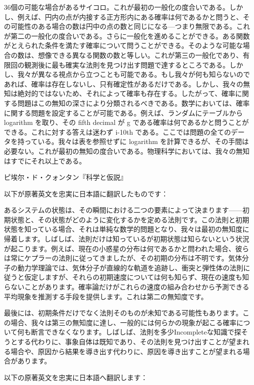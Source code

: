 \documentclass[a4paper,11pt,openany]{ltjsbook}
\begin{document}
36個の可能な場合があるサイコロ。これが最初の一般化の度合いである。しかし、例えば、円内の点が内接する正方形内にある確率は何であるかと問うと、その可能性のある場合の数は円中の点の数と同じになる—つまり無限である。これが第二の一般化の度合いである。さらに一般化を進めることができる。ある関数がとえられた条件を満たす確率について問うことができる。そのような可能な場合の数は、想像できる異なる関数の数と等しい。これが第三の一般化であり、有限回の観測後に最も確実な法則を見つけ出す問題で達するところである。しかし、我々が異なる視点から立つことも可能である。もし我々が何も知らないのであれば、確率は存在しないし、只有確定性があるだけである。しかし、我々の無知は絶対的ではないため、それによって確率も存在する。したがって、確率に関する問題はこの無知の深さにより分類されるべきである。数学においては、確率に関する問題を設定することが可能である。例えば、ランダムにテーブルから logarithm を取り、その fifth decimal が g である確率は何であるかと問うことができる。これに対する答えは迷わず i-10th である。ここでは問題の全てのデータを持っている。我々は表を参照せずに logarithm を計算できるが、その手間は必要ない。これが最初の無知の度合いである。物理科学においては、我々の無知はすでにそれ以上である。

ピ埃尔・ド・クォンタン『科学と仮説』

以下が原著英文を忠実に日本語に翻訳したものです：

あるシステムの状態は、その瞬間における二つの要素によって決まります——初期状態と、その状態がどのように変化するかを定める法則です。この法則と初期状態を知っている場合、それは単純な数学的問題となり、我々は最初の無知度に帰着します。しばしば、法則だけは知っているが初期状態は知らないという状況が起こります。例えば、現在の小惑星の分布は何であるかと問われた場合、彼らは常にケプラーの法則に従ってきましたが、その初期の分布は不明です。気体分子の動力学理論では、気体分子が直線的な軌道を追跡し、衝突と弾性体の法則に従うと仮定しますが、それらの初期速度については何も知らず、現在の速度も知らないことがあります。確率論だけがこれらの速度の組み合わせから予測できる平均現象を推測する手段を提供します。これは第二の無知度です。

最後には、初期条件だけでなく法則そのものが未知である可能性もあります。この場合、我々は第三の無知度に達し、一般的には何らかの現象が起こる確率について何も断言できなくなります。しばしば、法則を多少Incompleteな知識で探そうとする代わりに、事象自体は既知であり、その法則を見つけ出すことが望まれる場合や、原因から結果を導き出す代わりに、原因を導き出すことが望まれる場合があります。


以下の原著英文を忠実に日本語へ翻訳します：
\end{document}
